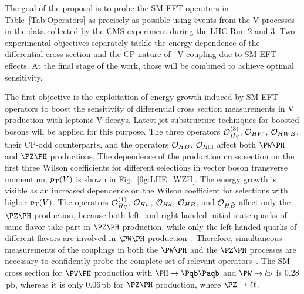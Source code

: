 \documentclass[a4paper,11pt]{article}
\newcommand{\Pb}{{{\Pqb}}\xspace}
\newcommand{\PAb}{{{{\Paqb}}}\xspace}
\renewcommand{\PV}{{{{V}}}\xspace}
\newcommand{\VH}{{{\PV}{\PH}}\xspace}
\newcommand{\pb} {\mbox{\ensuremath{\,\text{pb}}}\xspace}
\begin{document}
The goal of the proposal is to probe the SM-EFT operators in Table~\ref{Tab:Operators} as precisely as possible using events from the \VH processes in the data collected by the CMS experiment during the LHC Run 2 and 3. 
Two experimental objectives separately tackle the energy dependence of the differential cross section and the CP nature of \PH--\PV coupling due to SM-EFT effects.
At the final stage of the work, those will be combined to achieve optimal sensitivity.

The first objective is the exploitation of energy growth
induced by SM-EFT operators
to boost the sensitivity of differential cross section measurements in \VH production with leptonic \PV decays.
Latest jet substructure techniques for boosted \PH bosons will be applied for this purpose.
The three operators ${\cal O}^{(3)}_{Hq}$, ${\cal O}_{HW}$, ${\cal O}_{HWB}$, their CP-odd counterparts, and the operators ${\cal O}_{HD}$, ${\cal O}_{H\square}$ affect both $\PW\PH$ and $\PZ\PH$ productions. 
The dependence of the production cross section on the first three Wilson coefficients for different selections in vector boson transverse momentum, $\pt(\PV)$ is shown in Fig.~\ref{fig:LHE_WZH}. 
The energy growth is visible as an increased dependence on the Wilson coefficient for selections with higher $\pt(\PV)$. %
The operators ${\cal O}^{(1)}_{Hq}$, ${\cal O}_{Hu}$, ${\cal O}_{Hd}$, ${\cal O}_{HB}$, and ${\cal O}_{H\tilde{B}}$ affect only the $\PZ\PH$ production, 
because both left- and right-handed initial-state quarks of same flavor take part in $\PZ\PH$ production, while only the left-handed quarks of different flavors are involved in $\PW\PH$ production~\cite{Falkowski:2014tna,Banerjee:2018bio}. 
Therefore, simultaneous measurements of the couplings in both the $\PW\PH$ and the $\PZ\PH$ processes are necessary to confidently probe the complete set of relevant operators~\cite{Banerjee:2019twi}.
The SM cross section for $\PW\PH$ production with  $\PH\rightarrow\Pb\PAb$ and $\PW\rightarrow\ell\nu$  is 0.28\pb, whereas it is only 0.06\pb for $\PZ\PH$ production, where $\PZ\rightarrow\ell\ell$.
\end{document}
